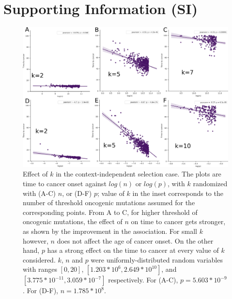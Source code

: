 \documentclass[9pt,twocolumn,twoside]{pnas-new}
\begin{document}







\section*{Supporting Information (SI)}
\begin{figure}[tbhp]
	\centering
	\includegraphics[width=.8\linewidth]{fig5.png}
	\caption{Effect of $k$ in the context-independent selection case. The plots are time to cancer onset against $log(n)$ or $log(p)$, with $k$ randomized with (A-C) $n$, or (D-F) $p$; value of $k$ in the inset corresponds to the number of threshold oncogenic mutations assumed for the corresponding points. From A to C, for higher threshold of oncogenic mutations, the effect of $n$ on time to cancer gets stronger, as shown by the improvement in the association. For small $k$ however, $n$ does not affect the age of cancer onset. On the other hand, $p$ has a strong effect on the time to cancer at every value of $k$ considered. $k$, $n$ and $p$ were uniformly-distributed random variables with ranges $[0, 20]$, $[1.203*10^{6}, 2.649*10^{10}]$, and $[3.775*10^{-11}, 3.059*10^{-7}]$ respectively. For (A-C), $p=5.603*10^{-9}$. For (D-F), $n=1.785*10^{8}$.}
	\label{figS1}
\end{figure}
\end{document}
